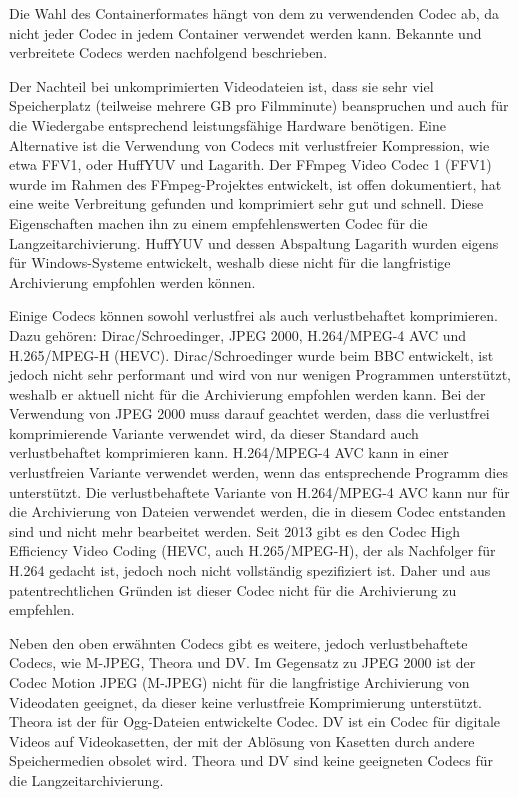 Die Wahl des Containerformates hängt von dem zu verwendenden Codec ab, da nicht jeder Codec in jedem Container verwendet werden kann. Bekannte und verbreitete Codecs werden nachfolgend beschrieben. 

Der Nachteil bei unkomprimierten Videodateien ist, dass sie sehr viel Speicherplatz (teilweise mehrere GB pro Filmminute) beanspruchen und auch für die Wiedergabe entsprechend leistungsfähige Hardware benötigen. Eine Alternative ist die Verwendung von Codecs mit verlustfreier Kompression, wie etwa FFV1, oder HuffYUV und Lagarith. Der FFmpeg Video Codec 1 (FFV1) wurde im Rahmen des FFmpeg-Projektes entwickelt, ist offen dokumentiert, hat eine weite Verbreitung gefunden und komprimiert sehr gut und schnell. Diese Eigenschaften machen ihn zu einem empfehlenswerten Codec für die Langzeitarchivierung. HuffYUV und dessen Abspaltung Lagarith wurden eigens für Windows-Systeme entwickelt, weshalb diese nicht für die langfristige Archivierung empfohlen werden können. 

Einige Codecs können sowohl verlustfrei als auch verlustbehaftet komprimieren. Dazu gehören: Dirac/Schroedinger, JPEG 2000, H.264/MPEG-4 AVC und H.265/MPEG-H (HEVC). Dirac/Schroedinger wurde beim BBC entwickelt, ist jedoch nicht sehr performant und wird von nur wenigen Programmen unterstützt, weshalb er aktuell nicht für die Archivierung empfohlen werden kann. Bei der Verwendung von JPEG 2000 muss darauf geachtet werden, dass die verlustfrei komprimierende Variante verwendet wird, da dieser Standard auch verlustbehaftet komprimieren kann. H.264/MPEG-4 AVC kann in einer verlustfreien Variante verwendet werden, wenn das entsprechende Programm dies unterstützt. Die verlustbehaftete Variante von H.264/MPEG-4 AVC kann nur für die Archivierung von Dateien verwendet werden, die in diesem Codec entstanden sind und nicht mehr bearbeitet werden. Seit 2013 gibt es den Codec High Efficiency Video Coding (HEVC, auch H.265/MPEG-H), der als Nachfolger für H.264 gedacht ist, jedoch noch nicht vollständig spezifiziert ist. Daher und aus patentrechtlichen Gründen ist dieser Codec nicht für die Archivierung zu empfehlen.

Neben den oben erwähnten Codecs gibt es weitere, jedoch verlustbehaftete Codecs, wie M-JPEG, Theora und DV. Im Gegensatz zu JPEG 2000 ist der Codec Motion JPEG (M-JPEG) nicht für die langfristige Archivierung von Videodaten geeignet, da dieser keine verlustfreie Komprimierung unterstützt. Theora ist der für Ogg-Dateien entwickelte Codec. DV ist ein Codec für digitale Videos auf Videokasetten, der mit der Ablösung von Kasetten durch andere Speichermedien obsolet wird. Theora und DV sind keine geeigneten Codecs für die Langzeitarchivierung.

